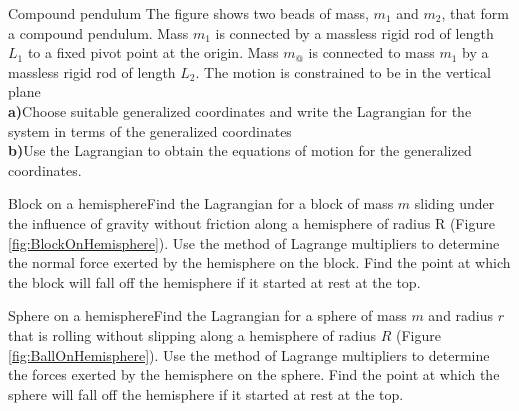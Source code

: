 \begin{problem}{Compound pendulum}
\label{prob_Lagrange_6}
The figure shows two beads of mass, $m_1$ and $m_2$, that form a compound pendulum. Mass $m_1$ is connected by a massless rigid rod of length $L_1$ to a fixed pivot point at the origin. Mass $m_@$ is connected to mass $m_1$ by a massless rigid rod of length $L_2$. The motion is constrained to be in the vertical plane
\\
\textbf{a)}Choose suitable generalized coordinates and write the Lagrangian for the system in terms of the generalized coordinates\\
\textbf{b)}Use the Lagrangian to obtain the equations of motion for the generalized coordinates.
\end{problem}

\begin{problem}{Block on a hemisphere}Find the Lagrangian for a block of mass $m$ sliding under the influence of gravity without friction along a hemisphere of radius R (Figure \ref{fig:BlockOnHemisphere}). Use the method of Lagrange multipliers to determine the normal force exerted by the hemisphere on the block. Find the point at which the block will fall off the hemisphere if it started at rest at the top.
\label{prob_Lagrange_7}
\end{problem}

\begin{problem}{Sphere on a hemisphere}Find the Lagrangian for a sphere of mass $m$ and radius $r$ that is rolling without slipping along a hemisphere of radius $R$ (Figure \ref{fig:BallOnHemisphere}). Use the method of Lagrange multipliers to determine the forces exerted by the hemisphere on the sphere. Find the point at which the sphere will fall off the hemisphere if it started at rest at the top.
\label{prob_Lagrange_8}
\end{problem}

